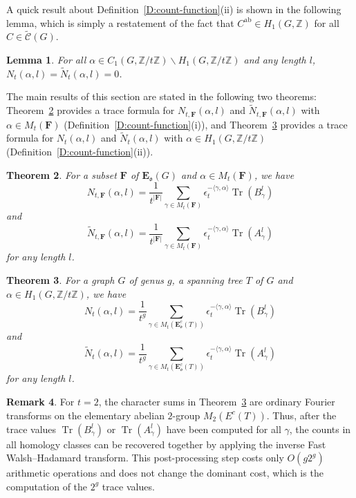 \documentclass[11pt]{amsart}
\renewcommand{\setminus}{\mathbin{\backslash}}%
\theoremstyle{plain}
\newtheorem{theorem}{Theorem}[section]
\newtheorem{lemma}[theorem]{Lemma}
\theoremstyle{definition}
\newtheorem{remark}[theorem]{Remark}
\newcommand{\mbbZ}{{\mathbb Z}}
\newcommand{\mcalC}{{\mathcal C}}
\newcommand{\mfrako}{{\mathfrak o}}
\newcommand{\vE}{{\mathbf E}}
\newcommand{\vF}{{\mathbf F}}
\DeclareMathOperator{\ab}{\operatorname{ab}}
\DeclareMathOperator{\trace}{\operatorname{Tr}}
\numberwithin{equation}{section}
\begin{document}
A quick result about Definition~\ref{D:count-function}(ii) is shown in the following lemma, which is simply a restatement of the fact that $C^{\ab}\in H_1(G,\mbbZ)$ for all $C\in \widetilde{\mcalC}(G)$. 
\begin{lemma}
For all $\alpha\in C_1(G,\mbbZ/t\mbbZ) \setminus H_1(G,\mbbZ/t\mbbZ)$ and any length $l$, $N_t(\alpha,l)=\widetilde{N}_t(\alpha,l)=0$. 
\end{lemma}

The main results of this section are stated in the following two theorems: Theorem~\ref{T:counting0} provides a trace formula for $N_{t,\vF}(\alpha,l)$ and $\widetilde{N}_{t,\vF}(\alpha,l)$ with $\alpha\in M_t(\vF)$ (Definition~\ref{D:count-function}(i)), and Theorem~\ref{T:counting} provides a trace formula for $N_t(\alpha,l)$ and $\widetilde{N}_t(\alpha,l)$ with $\alpha\in H_1(G,\mbbZ/t\mbbZ)$ (Definition~\ref{D:count-function}(ii)). 

\begin{theorem}\label{T:counting0}
For a subset $\vF$ of $\vE_\mfrako(G)$ and $\alpha\in M_t(\vF)$,  we have
$$N_{t,\vF}(\alpha,l) = \frac{1}{t^{|\vF|}}\sum_{\gamma\in M_t(\vF)}\epsilon_t^{-\langle\gamma, \alpha\rangle}\trace\left(B_\gamma^l\right)$$
and
$$ \widetilde{N}_{t,\vF}(\alpha,l)= \frac{1}{t^{|\vF|}}\sum_{\gamma\in M_t(\vF)}\epsilon_t^{-\langle\gamma, \alpha\rangle}\trace\left(A_\gamma^l\right)$$
for any length $l$. 
\end{theorem}



\begin{theorem}\label{T:counting}
For a graph $G$ of genus $g$, a spanning tree $T$ of  $G$ and $\alpha\in H_1(G,\mbbZ/t\mbbZ)$, we have
$$N_t(\alpha,l) = \frac{1}{t^g}\sum_{\gamma\in M_t(\vE_\mfrako^c(T))}\epsilon_t^{-\langle\gamma, \alpha\rangle}\trace\left(B_\gamma^l\right)$$
and
$$ \widetilde{N}_t(\alpha,l)= \frac{1}{t^g}\sum_{\gamma\in M_t(\vE_\mfrako^c(T))}\epsilon_t^{-\langle\gamma, \alpha\rangle}\trace\left(A_\gamma^l\right)$$
for any length $l$. 
\end{theorem}

\begin{remark}
For $t=2$, the character sums in Theorem~\ref{T:counting} are ordinary Fourier transforms on the elementary abelian $2$-group $M_2(E^c(T))$.  Thus, after the trace values $\trace(B_\gamma^l)$ or $\trace(A_\gamma^l)$ have been computed for all $\gamma$, the counts in all homology classes can be recovered together by applying the inverse Fast Walsh--Hadamard transform.  This post-processing step costs only $O(g2^g)$ arithmetic operations and does not change the dominant cost, which is the computation of the $2^g$ trace values.
\end{remark}
\end{document}
